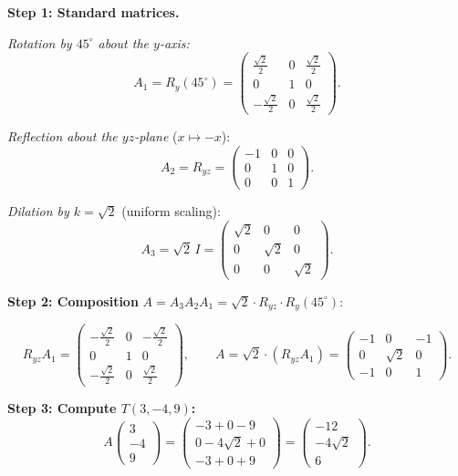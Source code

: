 \documentclass[12pt,a3paper]{article}
\begin{document}
\begin{tcolorbox}[enhanced,breakable,
  colback=cF!4,colframe=cF,boxrule=0.8pt,arc=5pt,
  title={\textbf{Answer --- Composition: Rot$(45^\circ,y)$ $\to$ Reflect$(yz)$ $\to$ Dilation$(\sqrt{2})$; $T(3,-4,9)$}},
  fonttitle=\bfseries\color{white},colbacktitle=cF]

\textbf{Step 1: Standard matrices.}

\textit{Rotation by $45^\circ$ about the $y$-axis:}
\[
A_1=R_y(45^\circ)=\begin{pmatrix}\frac{\sqrt{2}}{2}&0&\frac{\sqrt{2}}{2}\\0&1&0\\-\frac{\sqrt{2}}{2}&0&\frac{\sqrt{2}}{2}\end{pmatrix}.
\]

\textit{Reflection about the $yz$-plane} ($x\mapsto -x$):
\[
A_2=R_{yz}=\begin{pmatrix}-1&0&0\\0&1&0\\0&0&1\end{pmatrix}.
\]

\textit{Dilation by $k=\sqrt{2}$} (uniform scaling):
\[
A_3=\sqrt{2}\,I=\begin{pmatrix}\sqrt{2}&0&0\\0&\sqrt{2}&0\\0&0&\sqrt{2}\end{pmatrix}.
\]

\textbf{Step 2: Composition} $A=A_3A_2A_1=\sqrt{2}\cdot R_{yz}\cdot R_y(45^\circ)$:

\[
R_{yz}A_1=\begin{pmatrix}-\frac{\sqrt{2}}{2}&0&-\frac{\sqrt{2}}{2}\\0&1&0\\-\frac{\sqrt{2}}{2}&0&\frac{\sqrt{2}}{2}\end{pmatrix},
\qquad
A=\sqrt{2}\cdot(R_{yz}A_1)=\begin{pmatrix}-1&0&-1\\0&\sqrt{2}&0\\-1&0&1\end{pmatrix}.
\]

\textbf{Step 3: Compute $T(3,-4,9)$:}
\[
A\begin{pmatrix}3\\-4\\9\end{pmatrix}=\begin{pmatrix}-3+0-9\\0-4\sqrt{2}+0\\-3+0+9\end{pmatrix}=\boxed{\begin{pmatrix}-12\\-4\sqrt{2}\\6\end{pmatrix}}.
\]

\end{tcolorbox}
\end{document}
